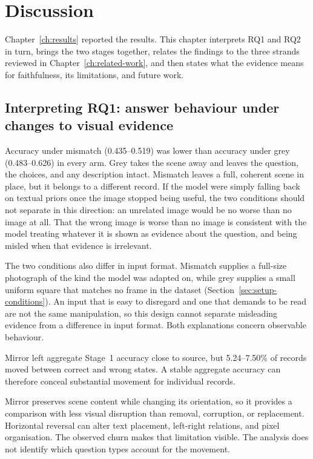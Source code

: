 
\chapter{Discussion}
\label{ch:discussion}

Chapter~\ref{ch:results} reported the results. This chapter interprets RQ1 and
RQ2 in turn, brings the two stages together, relates the findings to the three
strands reviewed in Chapter~\ref{ch:related-work}, and then states what the
evidence means for faithfulness, its limitations, and future work.

\section{Interpreting RQ1: answer behaviour under changes to visual evidence}
\label{sec:discussion-rq1}
\label{sec:discussion-descriptions}

Accuracy under mismatch (0.435--0.519) was lower than accuracy under
grey (0.483--0.626) in every arm. Grey takes the scene away and leaves the
question, the choices, and any description intact. Mismatch leaves a full,
coherent scene in place, but it belongs to a different record. If the model were
simply falling back on textual priors once the image stopped being useful, the
two conditions should not separate in this direction: an unrelated image would
be no worse than no image at all. That the wrong image is worse than no image is
consistent with the model treating whatever it is shown as evidence about the
question, and being misled when that evidence is irrelevant.

The two conditions also differ in input format. Mismatch supplies a full-size
photograph of the kind the model was adapted on, while grey supplies a small
uniform square that matches no frame in the dataset
(Section~\ref{sec:setup-conditions}). An input that is easy to disregard and one
that demands to be read are not the same
manipulation, so this design cannot separate misleading evidence from a
difference in input format. Both explanations concern observable behaviour.

Mirror left aggregate Stage~1 accuracy close to source, but 5.24--7.50\% of
records moved between correct and wrong states. A stable aggregate accuracy can
therefore conceal substantial movement for individual records.

Mirror preserves scene content while changing its orientation, so it provides a
comparison with less visual disruption than removal, corruption, or replacement.
Horizontal reversal can
alter text placement, left-right relations, and pixel organisation.
The observed churn makes that limitation visible. The analysis does not
identify which question types account for the movement.

